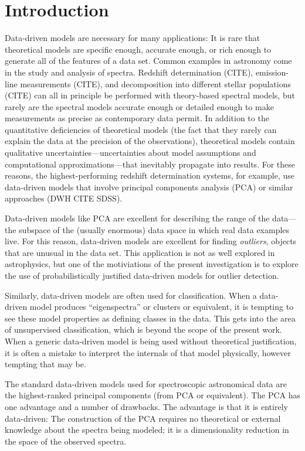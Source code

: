 \documentclass[12pt,preprint]{aastex}
\begin{document}
\section{Introduction}\label{intro}
Data-driven models are necessary for many applications: It is rare
that theoretical models are specific enough, accurate enough, or rich
enough to generate all of the features of a data set.  Common examples
in astronomy come in the study and analysis of spectra.  Redshift
determination (CITE), emission-line measurements (CITE), and
decomposition into different stellar populations (CITE) can all in
principle be performed with theory-based spectral models, but rarely
are the spectral models accurate enough or detailed enough to make
measurements as precise as contemporary data permit.  In addition to
the quantitative deficiencies of theoretical models (the fact that
they rarely can explain the data at the precision of the
observations), theoretical models contain qualitative
uncertainties---uncertainties about model assumptions and
computational approximations---that inevitably propagate into results.
For these reasons, the highest-performing redshift determination
systems, for example, use data-driven models that involve principal
components analysis (PCA) or similar approaches (DWH CITE SDSS).

Data-driven models like PCA are excellent for describing the range of
the data---the subspace of the (usually enormous) data space in which
real data examples live.  For this reason, data-driven models are
excellent for finding \emph{outliers}, objects that are unusual in the
data set.  This application is not as well explored in astrophysics,
but one of the motiviations of the present investigation is to explore
the use of probabilistically justified data-driven models for outlier
detection.

Similarly, data-driven models are often used for classification.  When
a data-driven model produces ``eigenspectra'' or clusters or
equivalent, it is tempting to see these model properties as defining
classes in the data.  This gets into the area of unsupervised
classification, which is beyond the scope of the present work.  When a
generic data-driven model is being used without theoretical
justification, it is often a mistake to interpret the internals of
that model physically, however tempting that may be.

The standard data-driven models used for spectroscopic astronomical
data are the highest-ranked principal components (from PCA or
equivalent). The PCA has one advantage and a number of drawbacks.  The
advantage is that it is entirely data-driven: The construction of the
PCA requires no theoretical or external knowledge about the spectra
being modeled; it is a dimensionality reduction in the space of the
observed spectra.
\end{document}
